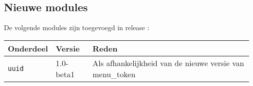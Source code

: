 


\subsection{Nieuwe modules} %
\label{sub:nieuwe_modules}

De volgende modules zijn toegevoegd in release \release:

\begin{tabularx}{\linewidth}{X|l|l} \hline
  Onderdeel & Versie & Reden \\ \hline
  \texttt{uuid} & 1.0-beta1 & Als afhankelijkheid van de nieuwe versie van menu\_token \\ \hline
\end{tabularx}






